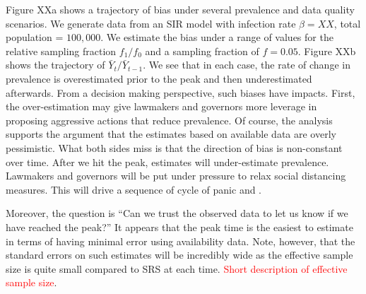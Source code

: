 \documentclass[11pt]{amsart}
\begin{document}
Figure XXa shows a trajectory of bias under several prevalence and data quality scenarios.  We generate data from an SIR model with infection rate $\beta = XX$, total population = $100,000$.  We estimate the bias under a range of values for the relative sampling fraction $f_1/f_0$ and a sampling fraction of $f = 0.05$.  Figure XXb shows the trajectory of $\bar Y_t / \bar Y_{t-1}$.  We see that in each case, the rate of change in prevalence is overestimated prior to the peak and then underestimated afterwards.  From a decision making perspective, such biases have impacts.  First, the over-estimation may give lawmakers and governors more leverage in proposing aggressive actions that reduce prevalence.  Of course, the analysis supports the argument that the estimates based on available data are overly pessimistic. What both sides miss is that the direction of bias is non-constant over time.  After we hit the peak, estimates will under-estimate prevalence.  Lawmakers and governors will be put under pressure to relax social distancing measures.  This will drive a sequence of cycle of panic and .

Moreover, the question is ``Can we trust the observed data to let us know if we have reached the peak?''  It appears that the peak time is the easiest to estimate in terms of having minimal error using availability data.  Note, however, that the standard errors on such estimates will be incredibly wide as the effective sample size is quite small compared to SRS at each time.  \textcolor{red}{Short description of effective sample size}.
\end{document}
